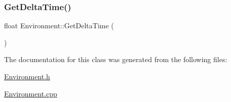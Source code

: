 \mbox{\label{class_environment_a4444c726d8d25a102ad12721385e3c3b}} 
\subsubsection{\texorpdfstring{Get\+Delta\+Time()}{GetDeltaTime()}}
{\footnotesize\ttfamily float Environment\+::\+Get\+Delta\+Time (\begin{DoxyParamCaption}{ }\end{DoxyParamCaption})\hspace{0.3cm}{\ttfamily [inline]}}



The documentation for this class was generated from the following files\+:\begin{DoxyCompactItemize}
\item 
\mbox{\hyperlink{_environment_8h}{Environment.\+h}}\item 
\mbox{\hyperlink{_environment_8cpp}{Environment.\+cpp}}\end{DoxyCompactItemize}
